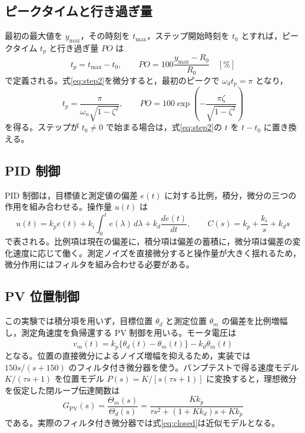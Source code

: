 \documentclass[dvipdfmx,a4paper,11pt]{jsarticle}
\begin{document}
\subsection{ピークタイムと行き過ぎ量}
最初の最大値を $y_{\max}$，その時刻を $t_{\max}$，ステップ開始時刻を $t_0$ とすれば，ピークタイム $t_p$ と行き過ぎ量 $PO$ は
\begin{equation}
 t_p=t_{\max}-t_0,\qquad PO=100\frac{y_{\max}-R_0}{R_0}\quad[\%]
 \label{eq:measured}
\end{equation}
で定義される。式\eqref{eq:step2}を微分すると，最初のピークで $\omega_d t_p=\pi$ となり，
\begin{equation}
 t_p=\frac{\pi}{\omega_n\sqrt{1-\zeta^2}},\qquad
 PO=100\exp\!\left(-\frac{\pi\zeta}{\sqrt{1-\zeta^2}}\right)
 \label{eq:theory}
\end{equation}
を得る\cite{manual}。ステップが $t_0\neq0$ で始まる場合は，式\eqref{eq:step2}の $t$ を $t-t_0$ に置き換える。

\subsection{PID 制御}
PID 制御は，目標値と測定値の偏差 $e(t)$ に対する比例，積分，微分の三つの作用を組み合わせる。操作量 $u(t)$ は
\begin{equation}
 u(t)=k_p e(t)+k_i\int_0^t e(\lambda)\,d\lambda+k_d\frac{de(t)}{dt},\qquad
 C(s)=k_p+\frac{k_i}{s}+k_d s
 \label{eq:pid}
\end{equation}
で表される。比例項は現在の偏差に，積分項は偏差の蓄積に，微分項は偏差の変化速度に応じて働く。測定ノイズを直接微分すると操作量が大きく揺れるため，微分作用にはフィルタを組み合わせる必要がある。

\subsection{PV 位置制御}
この実験では積分項を用いず，目標位置 $\theta_d$ と測定位置 $\theta_m$ の偏差を比例増幅し，測定角速度を負帰還する PV 制御を用いる。モータ電圧は
\begin{equation}
 v_m(t)=k_p\{\theta_d(t)-\theta_m(t)\}-k_d\dot{\theta}_m(t)
 \label{eq:pv}
\end{equation}
となる。位置の直接微分によるノイズ増幅を抑えるため，実装では $150s/(s+150)$ のフィルタ付き微分器を使う。バンプテストで得る速度モデル $K/(\tau s+1)$ を位置モデル $P(s)=K/[s(\tau s+1)]$ に変換すると，理想微分を仮定した閉ループ伝達関数は
\begin{equation}
 G_{\mathrm{PV}}(s)=\frac{\Theta_m(s)}{\Theta_d(s)}
 =\frac{Kk_p}{\tau s^2+(1+Kk_d)s+Kk_p}
 \label{eq:closed}
\end{equation}
である\cite{manual}。実際のフィルタ付き微分器では式\eqref{eq:closed}は近似モデルとなる。
\end{document}
